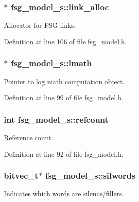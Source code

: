 \subsubsection[{link\-\_\-alloc}]{$\ast$ {\bf fsg\-\_\-model\-\_\-s\-::link\-\_\-alloc}}\label{structfsg__model__s_ac4e2a36305bbe62a5c7468588eb058b1}


\-Allocator for \-F\-S\-G links. 



\-Definition at line 106 of file fsg\-\_\-model.\-h.

\subsubsection[{lmath}]{$\ast$ {\bf fsg\-\_\-model\-\_\-s\-::lmath}}\label{structfsg__model__s_ab0b22dadb593ee1901829f89c4a47fe2}


\-Pointer to log math computation object. 



\-Definition at line 99 of file fsg\-\_\-model.\-h.

\subsubsection[{refcount}]{\setlength{\rightskip}{0pt plus 5cm}int {\bf fsg\-\_\-model\-\_\-s\-::refcount}}\label{structfsg__model__s_af329127556a42f6ea3b27f41a99a0b17}


\-Reference count. 



\-Definition at line 92 of file fsg\-\_\-model.\-h.

\subsubsection[{silwords}]{\setlength{\rightskip}{0pt plus 5cm}bitvec\-\_\-t$\ast$ {\bf fsg\-\_\-model\-\_\-s\-::silwords}}\label{structfsg__model__s_ab5709e67c1b7506ab024f2060d50331c}


\-Indicates which words are silence/fillers. 



